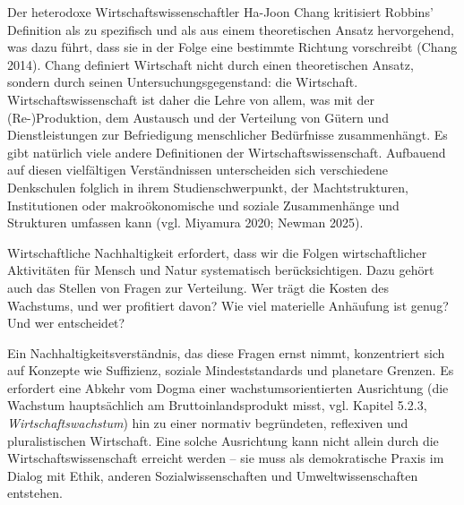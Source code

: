 \documentclass[
  nswissgerman,
  a4paper,
  DIV=11,
  numbers=noendperiod,
  oneside,
  openany]{scrreprt}
\begin{document}
Der heterodoxe Wirtschaftswissenschaftler Ha-Joon Chang kritisiert
Robbins' Definition als zu spezifisch und als aus einem theoretischen
Ansatz hervorgehend, was dazu führt, dass sie in der Folge eine
bestimmte Richtung vorschreibt (Chang 2014). Chang definiert Wirtschaft
nicht durch einen theoretischen Ansatz, sondern durch seinen
Untersuchungsgegenstand: die Wirtschaft. Wirtschaftswissenschaft ist
daher die Lehre von allem, was mit der (Re-)Produktion, dem Austausch
und der Verteilung von Gütern und Dienstleistungen zur Befriedigung
menschlicher Bedürfnisse zusammenhängt. Es gibt natürlich viele andere
Definitionen der Wirtschaftswissenschaft. Aufbauend auf diesen
vielfältigen Verständnissen unterscheiden sich verschiedene Denkschulen
folglich in ihrem Studienschwerpunkt, der Machtstrukturen, Institutionen
oder makroökonomische und soziale Zusammenhänge und Strukturen umfassen
kann (vgl. Miyamura 2020; Newman 2025).

Wirtschaftliche Nachhaltigkeit erfordert, dass wir die Folgen
wirtschaftlicher Aktivitäten für Mensch und Natur systematisch
berücksichtigen. Dazu gehört auch das Stellen von Fragen zur Verteilung.
Wer trägt die Kosten des Wachstums, und wer profitiert davon? Wie viel
materielle Anhäufung ist genug? Und wer entscheidet?

Ein Nachhaltigkeitsverständnis, das diese Fragen ernst nimmt,
konzentriert sich auf Konzepte wie Suffizienz, soziale Mindeststandards
und planetare Grenzen. Es erfordert eine Abkehr vom Dogma einer
wachstumsorientierten Ausrichtung (die Wachstum hauptsächlich am
Bruttoinlandsprodukt misst, vgl. Kapitel 5.2.3,
\emph{Wirtschaftswachstum}) hin zu einer normativ begründeten,
reflexiven und pluralistischen Wirtschaft. Eine solche Ausrichtung kann
nicht allein durch die Wirtschaftswissenschaft erreicht werden -- sie
muss als demokratische Praxis im Dialog mit Ethik, anderen
Sozialwissenschaften und Umweltwissenschaften entstehen.
\end{document}
